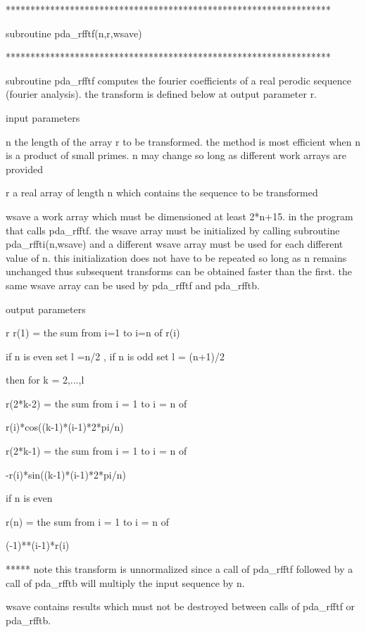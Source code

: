 \documentclass[11pt,twoside,nolof]{starlink}
\begin{document}


\begin{terminalv}
******************************************************************

subroutine pda_rfftf(n,r,wsave)

******************************************************************

subroutine pda_rfftf computes the fourier coefficients of a real
perodic sequence (fourier analysis). the transform is defined
below at output parameter r.

input parameters

n       the length of the array r to be transformed.  the method
        is most efficient when n is a product of small primes.
        n may change so long as different work arrays are provided

r       a real array of length n which contains the sequence
        to be transformed

wsave   a work array which must be dimensioned at least 2*n+15.
        in the program that calls pda_rfftf. the wsave array must be
        initialized by calling subroutine pda_rffti(n,wsave) and a
        different wsave array must be used for each different
        value of n. this initialization does not have to be
        repeated so long as n remains unchanged thus subsequent
        transforms can be obtained faster than the first.
        the same wsave array can be used by pda_rfftf and pda_rfftb.


output parameters

r       r(1) = the sum from i=1 to i=n of r(i)

        if n is even set l =n/2   , if n is odd set l = (n+1)/2

          then for k = 2,...,l

             r(2*k-2) = the sum from i = 1 to i = n of

                  r(i)*cos((k-1)*(i-1)*2*pi/n)

             r(2*k-1) = the sum from i = 1 to i = n of

                 -r(i)*sin((k-1)*(i-1)*2*pi/n)

        if n is even

             r(n) = the sum from i = 1 to i = n of

                  (-1)**(i-1)*r(i)

 *****  note
             this transform is unnormalized since a call of pda_rfftf
             followed by a call of pda_rfftb will multiply the input
             sequence by n.

wsave   contains results which must not be destroyed between
        calls of pda_rfftf or pda_rfftb.
\end{terminalv}
\end{document}
